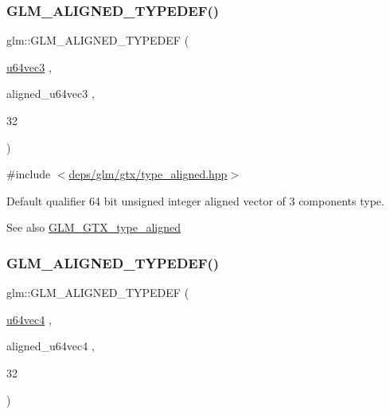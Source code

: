 \subsubsection{\texorpdfstring{G\+L\+M\+\_\+\+A\+L\+I\+G\+N\+E\+D\+\_\+\+T\+Y\+P\+E\+D\+E\+F()}{GLM\_ALIGNED\_TYPEDEF()}\hspace{0.1cm}{\footnotesize\ttfamily [135/209]}}
{\footnotesize\ttfamily glm\+::\+G\+L\+M\+\_\+\+A\+L\+I\+G\+N\+E\+D\+\_\+\+T\+Y\+P\+E\+D\+EF (\begin{DoxyParamCaption}\item[{\hyperlink{group__gtc__type__precision_ga2d3e22f2413f79536d5cf3561949cd53}{u64vec3}}]{,  }\item[{aligned\+\_\+u64vec3}]{,  }\item[{32}]{ }\end{DoxyParamCaption})}



{\ttfamily \#include $<$\hyperlink{gtx_2type__aligned_8hpp}{deps/glm/gtx/type\+\_\+aligned.\+hpp}$>$}

Default qualifier 64 bit unsigned integer aligned vector of 3 components type. \begin{DoxySeeAlso}{See also}
\hyperlink{group__gtx__type__aligned}{G\+L\+M\+\_\+\+G\+T\+X\+\_\+type\+\_\+aligned} 
\end{DoxySeeAlso}
\mbox{\label{group__gtx__type__aligned_ga53a8a03dca2015baec4584f45b8e9cdc}} 
\subsubsection{\texorpdfstring{G\+L\+M\+\_\+\+A\+L\+I\+G\+N\+E\+D\+\_\+\+T\+Y\+P\+E\+D\+E\+F()}{GLM\_ALIGNED\_TYPEDEF()}\hspace{0.1cm}{\footnotesize\ttfamily [136/209]}}
{\footnotesize\ttfamily glm\+::\+G\+L\+M\+\_\+\+A\+L\+I\+G\+N\+E\+D\+\_\+\+T\+Y\+P\+E\+D\+EF (\begin{DoxyParamCaption}\item[{\hyperlink{group__gtc__type__precision_ga70396c4f422824503c870db50b3059fd}{u64vec4}}]{,  }\item[{aligned\+\_\+u64vec4}]{,  }\item[{32}]{ }\end{DoxyParamCaption})}



